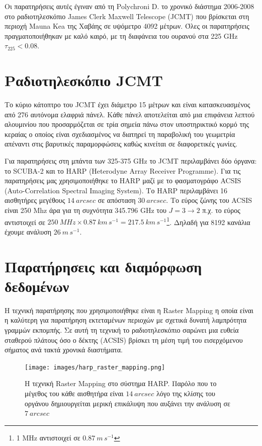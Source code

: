 \documentclass[a4paper,12pt]{memoir}
\begin{document}
Οι παρατηρήσεις αυτές έγιναν από τη Polychroni D. το χρονικό διάστημα 2006-2008 στο ραδιοτηλεσκόπιο James Clerk Maxwell Telescope (JCMT) που βρίσκεται στη περιοχή Mauna Kea της Χαβάης σε υψόμετρο 4092 μέτρων. Όλες οι παρατηρήσεις πραγματοποιήθηκαν με καλό καιρό, με τη διαφάνεια του ουρανού στα 225 GHz $\tau _{225} <0.08$.

\bigskip

\section{Ραδιοτηλεσκόπιο JCMT}

Το κύριο κάτοπτρο του JCMT έχει διάμετρο 15 μέτρων και είναι κατασκευασμένος από 276 αυτόνομα ελαφριά πάνελ. Κάθε πάνελ αποτελείται από μια επιφάνεια λεπτού αλουμινίου που προσαρμόζεται σε τρία σημεία πάνω στον υποστηρικτικό κορμό της κεραίας ο οποίος είναι σχεδιασμένος να διατηρεί τη παραβολική του γεωμετρία απέναντι στις βαρυτικές παραμορφώσεις καθώς κινείται σε διαφορετικές γωνίες.

Για παρατηρήσεις στη μπάντα των 325-375 GHz το JCMT περιλαμβάνει δύο όργανα: το SCUBA-2 και το HARP (Heterodyne Array Receiver Programme). Για τις παρατηρήσεις μας χρησιμοποιήθηκε το  HARP μαζί με το φασματογράφο ACSIS (Auto-Correlation Spectral Imaging System). Το HARP περιλαμβάνει 16 αισθητήρες μεγέθους $14 \ arcsec$ σε απόσταση $30 \ arcsec$. Το εύρος ζώνης του ACSIS είναι 250 Mhz άρα για τη συχνότητα 345.796 GHz του  $J=3\to 2$ π.χ. το εύρος αντιστοιχεί σε $250\ MHz \times 0.87\ km\,s^{-1} = 217.5\ km\,s^{-1}$\footnote{1 MHz αντιστοιχεί σε $0.87\  m\,s^{-1}$}. Δηλαδή για 8192 κανάλια έχουμε ανάλυση $26\ m\,s^{-1}$. 

\section{Παρατήρησεις και διαμόρφωση δεδομένων}
Η τεχνική παρατήρησης που χρησιμοποιήθηκε είναι η Raster Mapping η οποία είναι η καλύτερη για παρατήρηση εκτεταμένων περιοχών με σχετικά δυνατή λαμπρότητα γραμμών εκπομπής. Σε αυτή τη τεχνική το ραδιοτηλεσκόπιο σαρώνει μια ευθεία σταθερού πλάτους όσο ο δέκτης (ACSIS) βρίσκει τη μέση τιμή του εισερχόμενου σήματος ανά τακτά χρονικά διαστήματα. 


\begin{figure}[h!]
	\centering
	\texttt{[image: images/harp\_raster\_mapping.png]}
	\caption{Η τεχνική Raster Mapping στο σύστημα HARP. Παρόλο που το μέγεθος του κάθε αισθητήρα είναι $14\ arcsec$ λόγο της κλίσης του οργάνου δημιουργείται μερική επικάλυψη που αυξάνει την ανάλυση σε $7\ arcsec$ }
\end{figure}
\end{document}
